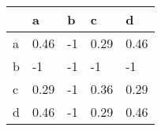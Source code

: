 \begin{tabular}{lllll}
\toprule
{} &     a &  b &     c &     d \\
\midrule
a &  0.46 & -1 &  0.29 &  0.46 \\
b &    -1 & -1 &    -1 &    -1 \\
c &  0.29 & -1 &  0.36 &  0.29 \\
d &  0.46 & -1 &  0.29 &  0.46 \\
\bottomrule
\end{tabular}
